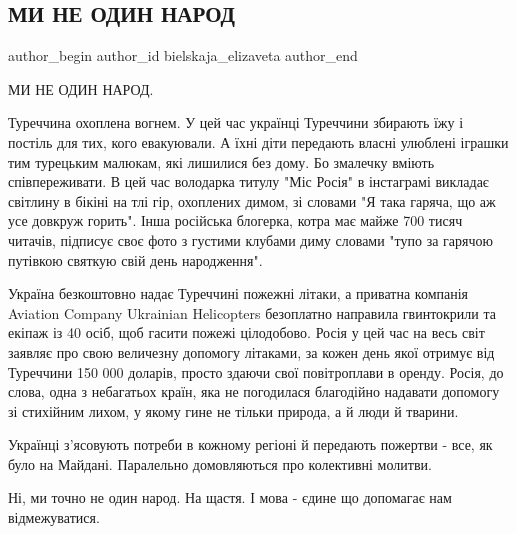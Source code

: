  
 
 
 
 
 
\subsection{МИ НЕ ОДИН НАРОД}
\label{sec:06_08_2021.fb.bielskaja_elizaveta.1.my_ne_odin_narod}
 
\ifcmt
 author_begin
   author_id bielskaja_elizaveta
 author_end
\fi

МИ НЕ ОДИН НАРОД.

Туреччина охоплена вогнем. У цей час українці Туреччини збирають їжу і постіль
для тих, кого евакуювали. А їхні діти передають власні улюблені іграшки тим
турецьким малюкам, які лишилися без дому. Бо змалечку вміють співпереживати. В
цей час володарка титулу "Міс Росія" в інстаграмі викладає світлину в бікіні на
тлі гір, охоплених димом, зі словами "Я така гаряча, що аж усе довкруж горить".
Інша російська блогерка, котра має майже 700 тисяч читачів, підписує своє фото
з густими клубами диму словами "тупо за гарячою путівкою святкую свій день
народження". 

Україна безкоштовно надає Туреччині пожежні літаки, а приватна компанія
Aviation Company Ukrainian Helicopters безоплатно направила гвинтокрили та
екіпаж із 40 осіб, щоб гасити пожежі цілодобово. Росія у цей час на весь світ
заявляє про свою величезну допомогу літаками, за кожен день якої отримує від
Туреччини 150 000 доларів, просто здаючи свої повітроплави в оренду. Росія, до
слова, одна з небагатьох країн, яка не погодилася благодійно надавати допомогу
зі стихійним лихом, у якому гине не тільки природа, а й люди й тварини. 

Українці з'ясовують потреби в кожному регіоні й передають пожертви - все, як
було на Майдані. Паралельно домовляються про колективні молитви.

Ні, ми точно не один народ. На щастя. І мова - єдине що допомагає нам
відмежуватися.


